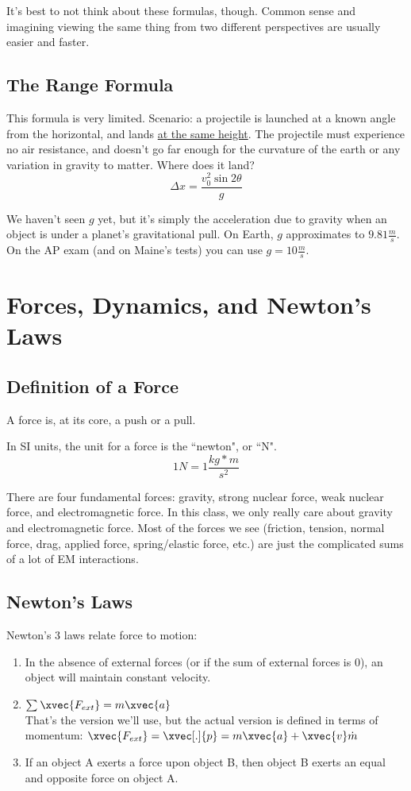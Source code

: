 \documentclass{article}
\begin{document}
It's best to not think about these formulas, though. Common sense and imagining viewing the same thing from two different perspectives are usually easier and faster.

\subsection{The Range Formula}
This formula is very limited. Scenario: a projectile is launched at a known angle from the horizontal, and lands \uline{at the same height}. The projectile must experience no air resistance,
and doesn't go far enough for the curvature of the earth or any variation in gravity to matter. Where does it land?
$$ \Delta x = \frac{v_0^2\sin{2\theta}}{g} $$

We haven't seen $ g $ yet, but it's simply the acceleration due to gravity when an object is under a planet's gravitational pull. On Earth, $ g $ approximates to $ 9.81 \frac{m}{s} $. On the AP exam (and
on Maine's tests) you can use $ g = 10 \frac{m}{s} $.

\newpage
\section{Forces, Dynamics, and Newton's Laws}
\subsection {Definition of a Force}
A force is, at its core, a push or a pull.

In SI units, the unit for a force is the ``newton", or ``N".
$$ 1 N = 1 \frac{kg * m}{s^2} $$

There are four fundamental forces: gravity, strong nuclear force, weak nuclear force, and electromagnetic force. In this class, we only really care about gravity and electromagnetic force. Most of the
forces we see (friction, tension, normal force, drag, applied force, spring/elastic force, etc.) are just the complicated sums of a lot of EM interactions.

\subsection {Newton's Laws}
Newton's 3 laws relate force to motion:
\begin{enumerate}
    \item
        In the absence of external forces (or if the sum of external forces is 0), an object will maintain constant velocity.
    \item
        $ \sum_{}^{}{\xvec{F_{ext}} = m\xvec{a}} $ \\ That's the version we'll use, but the actual version is defined in terms of momentum: $ \xvec{F_{ext}} = \xvec[.]{p} = m\xvec{a} + \xvec{v}\dot{m} $
    \item
        If an object A exerts a force upon object B, then object B exerts an equal and opposite force on object A.
\end{enumerate}
\end{document}
